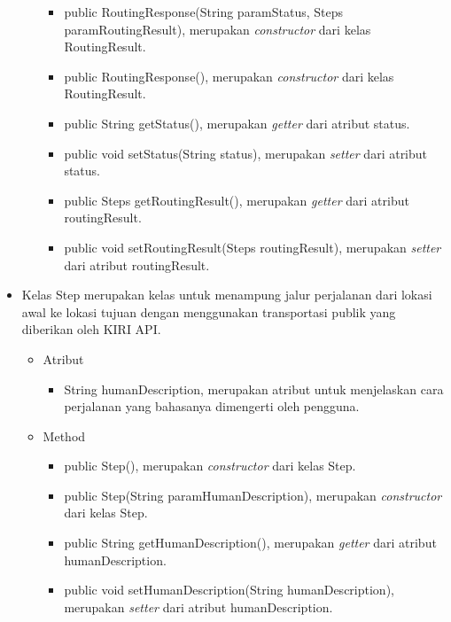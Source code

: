 \begin{itemize}
\begin{itemize}
					
									\begin{itemize}
												\item public RoutingResponse(String paramStatus, Steps paramRoutingResult), merupakan \textit{constructor} dari kelas RoutingResult.
												\item public RoutingResponse(), merupakan \textit{constructor} dari kelas RoutingResult.
												\item public String getStatus(), merupakan \textit{getter} dari atribut status.
												\item public void setStatus(String status), merupakan \textit{setter} dari atribut status.
												\item public Steps getRoutingResult(), merupakan \textit{getter} dari atribut routingResult.
												\item public void setRoutingResult(Steps routingResult), merupakan \textit{setter} dari atribut routingResult.
									\end{itemize}
				\end{itemize}
		
		\item Kelas Step merupakan kelas untuk menampung jalur perjalanan dari lokasi awal ke lokasi tujuan dengan menggunakan transportasi publik yang diberikan oleh KIRI API.
		
		
				\begin{itemize}
							\item Atribut
					
					
									\begin{itemize}
												\item String humanDescription, merupakan atribut untuk menjelaskan cara perjalanan yang bahasanya dimengerti oleh pengguna.
									\end{itemize}
					
							\item Method
					
					
									\begin{itemize}
												\item public Step(), merupakan \textit{constructor} dari kelas Step.
												\item public Step(String paramHumanDescription), merupakan \textit{constructor} dari kelas Step.
												\item public String getHumanDescription(), merupakan \textit{getter} dari atribut humanDescription.
												\item public void setHumanDescription(String humanDescription), merupakan \textit{setter} dari atribut humanDescription.
									\end{itemize}
				\end{itemize}
		

\end{itemize}
